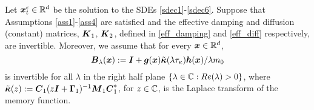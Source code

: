 \begin{theorem} \label{general_result}
Let $\boldsymbol{x}^\epsilon_{t} \in \mathbb{R}^{d}$ be the solution to the SDEs \eqref{sdec1}-\eqref{sdec6}. Suppose that Assumptions \ref{ass1}-\ref{ass4} are satisfied and the effective damping and diffusion (constant) matrices, $\boldsymbol{K}_1$, $\boldsymbol{K}_2$, defined in \eqref{eff_damping} and \eqref{eff_diff} respectively, are invertible. Moreover, we assume that for every $\boldsymbol{x} \in \mathbb{R}^d$,  
\begin{equation} \label{inv_cond}
\boldsymbol{B}_\lambda(\boldsymbol{x}) := \boldsymbol{I} + \boldsymbol{g}(\boldsymbol{x}) \tilde{\boldsymbol{\kappa}}(\lambda \tau_{\kappa}) \boldsymbol{h}(\boldsymbol{x})/\lambda m_0
\end{equation}
is invertible for all $\lambda$ in the right half plane $\{\lambda \in \mathbb{C}: Re(\lambda)>0\}$, where $\tilde{\boldsymbol{\kappa}}(z) := \boldsymbol{C}_1(z\boldsymbol{I} + \boldsymbol{\Gamma}_1)^{-1}\boldsymbol{M}_1 \boldsymbol{C}_1^*$, for $z \in \mathbb{C}$, is the Laplace transform of the memory function. 


\end{theorem}
